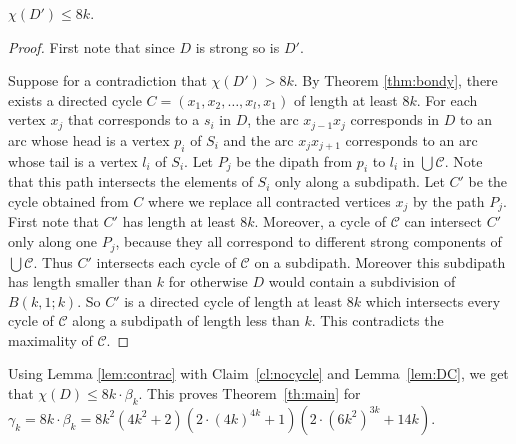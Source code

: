 \documentclass{endm}
\begin{document}
\begin{claim}\label{cl:nocycle}
$\chi(D') \leq 8k$.
\end{claim} 

\begin{proof}
First note that since $D$ is strong so is $D'$. 

Suppose for a contradiction that $\chi(D') > 8k$. By Theorem \ref{thm:bondy}, there exists
a directed cycle $C = (x_1, x_2, \dots , x_l, x_1)$ of length at least $8k$. 	
For each vertex $x_j$ that corresponds to a $s_i$ in $D$, the arc $x_{j-1}x_j$ corresponds in $D$ to an arc whose head is a vertex $p_i$ of $S_i$ and the arc $x_jx_{j+1}$ corresponds to an arc whose tail is a vertex $l_i$ of $S_i$. Let $P_j$ be the dipath 
		from $p_i$ to $l_i$ in $\bigcup \mathcal{C}$. Note that this path intersects the elements of $S_i$ only along a subdipath. 
Let $C'$ be the cycle obtained from $C$ where we replace all contracted vertices $x_j$ by the path $P_j$. 
First note that $C'$ has length at least $8k$. Moreover, a cycle of $\mathcal{C}$  can
intersect $C'$ only along one $P_j$, because they all correspond to different strong components of $\bigcup \mathcal{C}$. Thus $C'$ intersects  each cycle of $\mathcal{C}$ on a subdipath. Moreover this subdipath has length smaller than $k$ for otherwise $D$ would contain 
a subdivision of $B(k,1;k)$. So $C'$ is a directed cycle of length at least $8k$ which intersects every cycle of $\mathcal{C}$ along a 
subdipath of length less than $k$. This contradicts the maximality of $\mathcal{C}$.
\end{proof}


Using Lemma \ref{lem:contrac} with
Claim~\ref{cl:nocycle} and Lemma~\ref{lem:DC}, we get that $\chi(D) \leq 8k \cdot \beta_k$.
This proves Theorem~\ref{th:main} for $\gamma_k=8k\cdot \beta_k = 8k^2(4k^2+2)(2\cdot (4k)^{4k} + 1) (2\cdot (6k^2)^{3k} + 14k)$.
\end{document}
